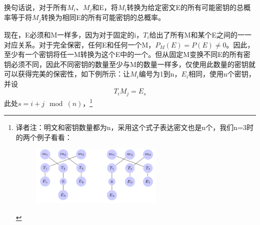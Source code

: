 \documentclass[]{article}
\begin{document}
换句话说，对于所有$M_i$、$M_j$和E，将$M_i$转换为给定密文E的所有可能密钥的总概率等于将$M_j$转换为相同E的所有可能密钥的总概率。

现在，E必须和M一样多，因为对于固定的i，$T_i$给出了所有M和某个E之间的一一对应关系。对于完全保密，任何E和任何一个M，$P_M(E)=P(E)\neq 0$。因此，至少有一个密钥将任一M转换为这个E中的一个。但从固定M变换不同E的所有密钥必须不同，因此不同密钥的数量至少与M的数量一样多，仅使用此数量的密钥就可以获得完美的保密性，如下例所示：让$M_i$编号为1到n，$E_i$相同，使用n个密钥，并设
\[T_i M_j=E_s\]
此处$s=i+j \mod(n)$，\footnote{译者注：明文和密钥数量都为n，采用这个式子表达密文也是n个，我们n=3时的两个例子看看：
%	
%	
%	
%	
%	
%
%	
%	
%	
%	
%	
%	
%	
%	
\begin{figure}[H]
	\includegraphics[width=0.6\textwidth]{tran-sample1.png}
\end{figure}
}
\end{document}

